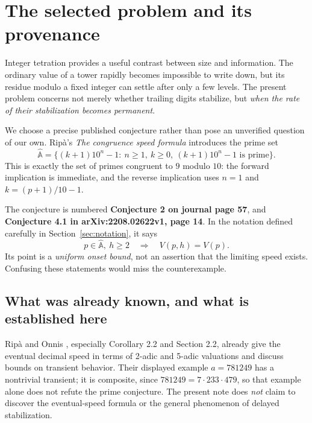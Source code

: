 \documentclass[11pt,letterpaper]{article}
\numberwithin{equation}{section}
\theoremstyle{definition}
\theoremstyle{remark}
\begin{document}
\tableofcontents
\newpage

\section{The selected problem and its provenance}\label{sec:problem}

Integer tetration provides a useful contrast between size and information. The ordinary value of a tower rapidly becomes impossible to write down, but its residue modulo a fixed integer can settle after only a few levels. The present problem concerns not merely whether trailing digits stabilize, but \emph{when the rate of their stabilization becomes permanent}.

We choose a precise published conjecture rather than pose an unverified question of our own. Rip\`a's \emph{The congruence speed formula} \cite{Ripa2021} introduces the prime set
\begin{equation}\label{eq:source-set}
 \widehat{\mathbb A}=\{(k+1)10^n-1:\ n\ge1,\ k\ge0,\ (k+1)10^n-1\text{ is prime}\}.
\end{equation}
This is exactly the set of primes congruent to $9$ modulo $10$: the forward implication is immediate, and the reverse implication uses $n=1$ and $k=(p+1)/10-1$.

The conjecture is numbered \textbf{Conjecture 2 on journal page 57}, and \textbf{Conjecture 4.1 in arXiv:2208.02622v1, page 14}. In the notation defined carefully in Section~\ref{sec:notation}, it says
\begin{equation}\label{eq:conjecture}
  p\in\widehat{\mathbb A},\ h\ge2
  \quad\Longrightarrow\quad V(p,h)=V(p).
\end{equation}
Its point is a \emph{uniform onset bound}, not an assertion that the limiting speed exists. Confusing these statements would miss the counterexample.

\subsection{What was already known, and what is established here}

Rip\`a and Onnis \cite{RipaOnnis2022}, especially Corollary 2.2 and Section 2.2, already give the eventual decimal speed in terms of 2-adic and 5-adic valuations and discuss bounds on transient behavior. Their displayed example $a=781249$ has a nontrivial transient; it is composite, since $781249=7\cdot233\cdot479$, so that example alone does not refute the prime conjecture. The present note does \emph{not} claim to discover the eventual-speed formula or the general phenomenon of delayed stabilization.
\end{document}
